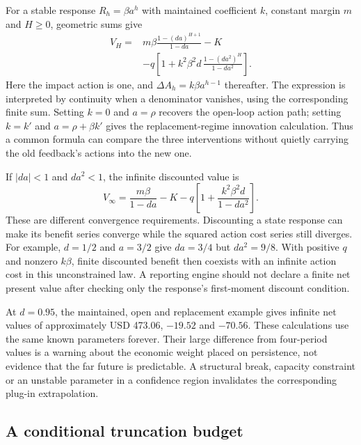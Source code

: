 For a stable response $R_h=\beta a^h$ with maintained coefficient $k$,
constant margin $m$ and $H\geq0$, geometric sums give
\begin{align}
 V_H={}&m\beta\frac{1-(da)^{H+1}}{1-da}-K\nonumber\\
 &-q\left[1+k^2\beta^2d\,
                   \frac{1-(da^2)^H}{1-da^2}\right].
 \label{exec17:s6-geometric-value}
\end{align}
Here the impact action is one, and $\Delta A_h=k\beta a^{h-1}$
thereafter. The expression is interpreted by continuity when a denominator
vanishes, using the corresponding finite sum. Setting $k=0$ and
$a=\rho$ recovers the open-loop action path; setting $k=k'$ and
$a=\rho+\beta k'$ gives the replacement-regime innovation calculation.
Thus a common formula can compare the three interventions without
quietly carrying the old feedback's actions into the new one.

If $|da|<1$ and $da^2<1$, the infinite discounted value is
\begin{equation}
 V_\infty=\frac{m\beta}{1-da}-K
       -q\left[1+\frac{k^2\beta^2d}{1-da^2}\right].
 \label{exec17:s6-infinite-value}
\end{equation}
These are different convergence requirements. Discounting a state response
can make its benefit series converge while the squared action cost series
still diverges. For example, $d=1/2$ and $a=3/2$ give $da=3/4$ but
$da^2=9/8$. With positive $q$ and nonzero $k\beta$, finite discounted
benefit then coexists with an infinite action cost in this unconstrained
law. A reporting engine should not declare a finite net present value
after checking only the response's first-moment discount condition.

At $d=0.95$, the maintained, open and replacement example gives infinite
net values of approximately USD 473.06, $-19.52$ and $-70.56$.
These calculations use the same known parameters forever. Their large
difference from four-period values is a warning about the economic weight
placed on persistence, not evidence that the far future is predictable.
A structural break, capacity constraint or an unstable parameter in a
confidence region invalidates the corresponding plug-in extrapolation.

\subsection{A conditional truncation budget}

